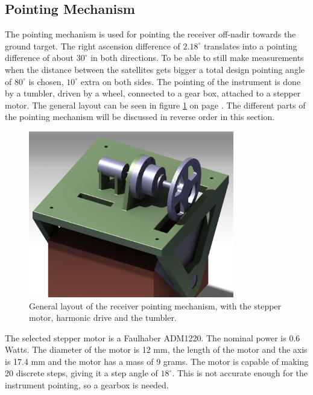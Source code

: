 \subsection{Pointing Mechanism}
\label{ss:recDDpoint}
The pointing mechanism is used for pointing the receiver off-nadir towards the ground target. The right ascension difference of $2.18^\circ$ translates into a pointing difference of about $30^\circ$ in both directions. To be able to still make measurements when the distance between the satellites gets bigger a total design pointing angle of $80^\circ$ is chosen, $10^\circ$ extra on both sides. The pointing of the instrument is done by a tumbler, driven by a wheel, connected to a gear box, attached to a stepper motor. The general layout can be seen in figure \ref{fig:point} on page \pageref{fig:point}. The different parts of the pointing mechanism will be discussed in reverse order in this section.

\begin{figure} [h]
\centering
\includegraphics[width=0.8\textwidth]{chapters/img/point_setup.png}
\caption[General layout of the receiver pointing mechanism]{General layout of the receiver pointing mechanism, with the stepper motor, harmonic drive and the tumbler.}
\label{fig:point}
\end{figure}

The selected stepper motor is a Faulhaber ADM1220. The nominal power is 0.6 Watts. The diameter of the motor is 12 mm, the length of the motor and the axis is 17.4 mm and the motor has a mass of 9 grams. The motor is capable of making 20 discrete steps, giving it a step angle of $18^\circ$. This is not accurate enough for the instrument pointing, so a gearbox is needed.

